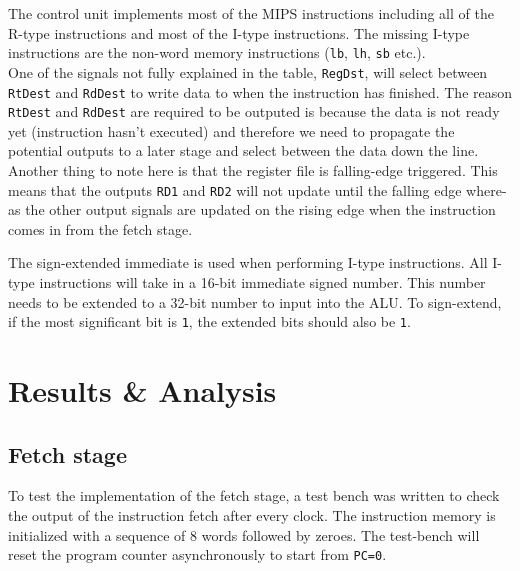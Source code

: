 \documentclass[CMPE]{../KGCOEReport}
\def\code#1{\texttt{#1}}
\begin{document}
    The control unit implements most of the MIPS instructions including all 
    of the R-type instructions and most of the I-type instructions.
    The missing I-type instructions are the non-word memory instructions
    (\code {lb}, \code{lh}, \code{sb} etc.).
    \\
    One of the signals not fully explained in the table, \code{RegDst}, will select
    between \code{RtDest} and \code{RdDest} to write data to when the instruction
    has finished. The reason \code{RtDest} and \code{RdDest} are required to be
    outputed is because the data is not ready yet (instruction hasn't executed)
    and therefore we need to propagate the potential outputs to a later stage
    and select between the data down the line.
    \\
    Another thing to note here is that the register file is falling-edge triggered.
    This means that the outputs \code{RD1} and \code{RD2} will not update until
    the falling edge where-as the other output signals are updated on the rising edge when the instruction comes in from the fetch stage.
    
    The sign-extended immediate is used when performing I-type instructions.
    All I-type instructions will take in a 16-bit immediate signed number.
    This number needs to be extended to a 32-bit number to input into the ALU.
    To sign-extend, if the most significant bit is \code{1}, the extended bits
    should also be \code{1}.

    \section*{Results \& Analysis}
    \subsection*{Fetch stage}
    To test the implementation of the fetch stage, a test bench was written
    to check the output of the instruction fetch after every clock.
    The instruction memory is initialized with a sequence of 8 words followed
    by zeroes.
    The test-bench will reset the program counter asynchronously to start from
    \code{PC=0}.
    
\end{document}
